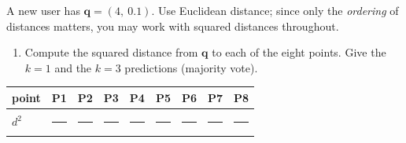 \documentclass[
  11pt,
]{article}
\newcounter{none} %
\providecommand{\tightlist}{%
  \setlength{\itemsep}{0pt}\setlength{\parskip}{0pt}}
\newcommand{\blank}[1][1.2in]{\rule{#1}{0.4pt}}
\newcommand{\answerpage}{\clearpage}
\begin{document}
A new user has \(\mathbf{q} = (4,\ 0.1)\). Use Euclidean distance; since
only the \emph{ordering} of distances matters, you may work with squared
distances throughout.

\answerpage

\begin{enumerate}
\def\labelenumi{(\alph{enumi})}
\tightlist
\item
  Compute the squared distance from \(\mathbf{q}\) to each of the eight
  points. Give the \(k = 1\) and the \(k = 3\) predictions (majority
  vote).
\end{enumerate}

{\def\LTcaptype{none} %
\begin{longtable}[]{@{}
  >{\raggedright\arraybackslash}p{}
  >{\raggedright\arraybackslash}p{}
  >{\raggedright\arraybackslash}p{}
  >{\raggedright\arraybackslash}p{}
  >{\raggedright\arraybackslash}p{}
  >{\raggedright\arraybackslash}p{}
  >{\raggedright\arraybackslash}p{}
  >{\raggedright\arraybackslash}p{}
  >{\raggedright\arraybackslash}p{}@{}}
\toprule\noalign{}
\begin{minipage}[b]{\linewidth}\raggedright
point
\end{minipage} & \begin{minipage}[b]{\linewidth}\raggedright
P1
\end{minipage} & \begin{minipage}[b]{\linewidth}\raggedright
P2
\end{minipage} & \begin{minipage}[b]{\linewidth}\raggedright
P3
\end{minipage} & \begin{minipage}[b]{\linewidth}\raggedright
P4
\end{minipage} & \begin{minipage}[b]{\linewidth}\raggedright
P5
\end{minipage} & \begin{minipage}[b]{\linewidth}\raggedright
P6
\end{minipage} & \begin{minipage}[b]{\linewidth}\raggedright
P7
\end{minipage} & \begin{minipage}[b]{\linewidth}\raggedright
P8
\end{minipage} \\
\midrule\noalign{}
\endhead
\bottomrule\noalign{}
\endlastfoot
\(d^2\) & \blank[0.45in] & \blank[0.45in] & \blank[0.45in] &
\blank[0.45in] & \blank[0.45in] & \blank[0.45in] & \blank[0.45in] &
\blank[0.45in] \\
\end{longtable}
}
\end{document}

